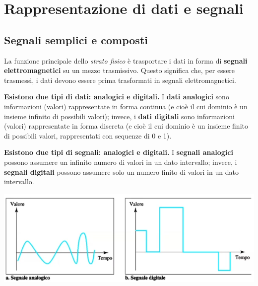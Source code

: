 \section{Rappresentazione di dati e segnali}

    \subsection{Segnali semplici e composti}
    
        La funzione principale dello \textit{strato fisico} è trasportare i dati in forma di \textbf{segnali elettromagnetici} su un mezzo trasmissivo. Questo significa che, per essere trasmessi, i dati devono essere prima trasformati in segnali elettromagnetici.
        
        \vspace{3mm}
        
        \textbf{Esistono due tipi di dati: analogici e digitali.} I \textbf{dati analogici} sono informazioni (valori) rappresentate in forma continua (e cioè il cui dominio è un insieme infinito di possibili valori); invece, i \textbf{dati digitali} sono informazioni (valori) rappresentate in forma discreta (e cioè il cui dominio è un insieme finito di possibili valori, rappresentati con sequenze di 0 e 1).
        
        \vspace{3mm}
        
        \textbf{Esistono due tipi di segnali: analogici e digitali.} I \textbf{segnali analogici} possono assumere un infinito numero di valori in un dato intervallo; invece, i \textbf{segnali digitali} possono assumere solo un numero finito di valori in un dato intervallo.
        
        \begin{center}
            \includegraphics[scale=0.25]{images/Esempio-Segnali.png}
         \end{center}
        
        \vspace{3mm}
        
